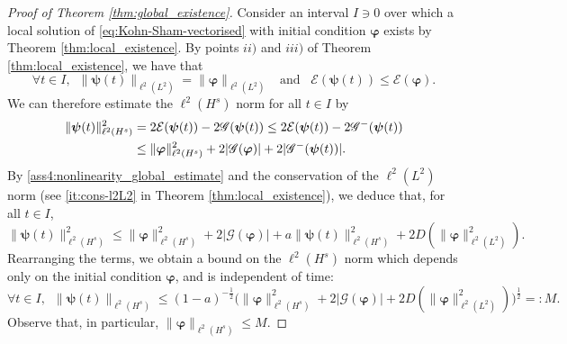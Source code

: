 \documentclass[12pt,a4paper]{amsart}
\numberwithin{equation}{section}
\newcommand{\ulpsi}{\boldsymbol{\psi}}
\newcommand{\ulphi}{\boldsymbol{\varphi}}
\begin{document}
	\begin{proof}[Proof of Theorem \ref{thm:global_existence}]\label{proof:global_esitence}
		Consider an interval $ I \ni 0 $ over which a local solution of \eqref{eq:Kohn-Sham-vectorised} with initial condition $ \ulphi $ exists by Theorem \ref{thm:local_existence}. By points $ii)$ and $iii)$ of Theorem \ref{thm:local_existence}, we have that 
		\begin{equation}
			\forall t \in I, \;\ \| \ulpsi(t) \|_{\ell^2(L^2)} = \| \ulphi \|_{\ell^2(L^2)} \;\  \text{ and } \;\ \mathcal{E}(\ulpsi(t)) \leq \mathcal{E} (\ulphi ).
		\end{equation}
		We can therefore estimate the $\ell^2(H^{s}) $ norm for all $ t \in I $ by
		\begin{align} \notag
			\| \ulpsi(t) \|_{\ell^2(H^s)}^2 & =  2 \mathcal{E}(\ulpsi(t)) - 2  \mathscr{G}(\ulpsi(t)) \leq  2 \mathcal{E}(\ulpsi(t)) - 2  \mathscr{G}^-(\ulpsi(t))
			\\ \label{H12_estimate_global_ex}
			&\leq  \| \ulphi \|_{\ell^2(H^s)}^2 + 2  |\mathscr{G}(\ulphi)| + 2|\mathscr{G}^-(\ulpsi(t))|  . 
		\end{align}
		By \ref{ass4:nonlinearity_global_estimate} and the conservation of the $\ell^2(L^2)$ norm (see \ref{it:cons-l2L2} in Theorem \ref{thm:local_existence}), we deduce that, for all $t \in I$,
		\begin{equation*}
			\| \ulpsi(t) \|_{\ell^2(H^s)}^2 
			\leq \| \ulphi \|_{\ell^2(H^s)}^2  + 2  |\mathscr{G}(\ulphi)|  + a  \| \ulpsi(t) \|_{\ell^2(H^{s})}^2 +2D(\|\ulphi \|_{\ell^2(L^2)}^2) .
		\end{equation*}
		Rearranging the terms, we obtain a bound on the $ \ell^2(H^{s}) $ norm which depends only on the initial condition $ \ulphi $, and is independent of time:
		\begin{equation}\label{est:bound_dep_only_initial_cond}
			\forall t \in I , \;\ 	\| \ulpsi(t) \|_{\ell^2(H^s)} 
			\leq (1-a)^{-\frac{1}{2}}\Big( \| \ulphi \|_{\ell^2(H^s)}^2 + 2  |\mathscr{G}(\ulphi)| +  2D(\|\ulphi \|_{\ell^2(L^2)}^2) \Big)^{\frac{1}{2}} =:M.
		\end{equation}
		Observe that, in particular, $ \| \ulphi \|_{\ell^2(H^s)} \leq M $.
		

\end{proof}
\end{document}
